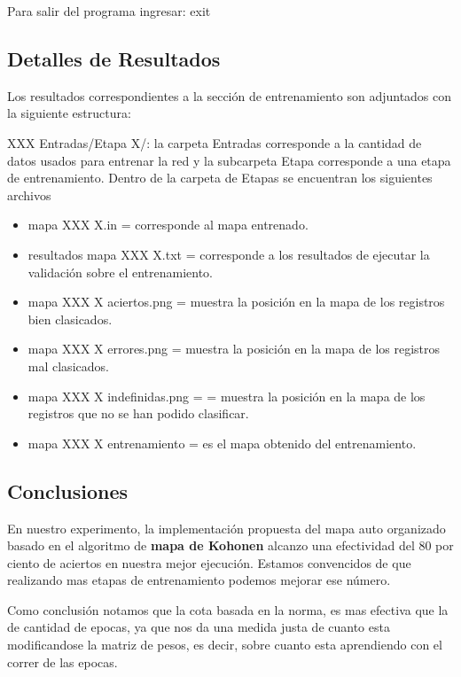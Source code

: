 Para salir del programa ingresar: exit


\subsection{Detalles de Resultados}

Los resultados correspondientes a la sección de entrenamiento son adjuntados con 
la siguiente estructura:

XXX Entradas/Etapa X/: la carpeta Entradas corresponde a la cantidad de datos usados para entrenar la red
y la subcarpeta Etapa corresponde a una etapa de entrenamiento. Dentro de la carpeta de
Etapas se encuentran los siguientes archivos

\begin{itemize}
	\item mapa XXX X.in =  corresponde al mapa entrenado.
	\item resultados mapa XXX X.txt = corresponde a los resultados de ejecutar la
validación sobre el entrenamiento.
	\item mapa XXX X aciertos.png = muestra la posición en la mapa de los registros bien clasicados.
	\item mapa XXX X errores.png = muestra la posición en la mapa de los registros mal clasicados.
	\item mapa XXX X indefinidas.png = = muestra la posición en la mapa de los registros que no
se han podido clasificar.
	\item mapa XXX X entrenamiento = es el mapa obtenido del entrenamiento.
\end{itemize}

\subsection{Conclusiones}

En nuestro experimento, la implementación propuesta del mapa auto organizado basado en el algoritmo
de \textbf{mapa de Kohonen} alcanzo una efectividad del 80 por ciento de aciertos en nuestra mejor
ejecución.
Estamos convencidos de que realizando mas etapas de entrenamiento podemos mejorar ese número.

Como conclusión notamos que la cota basada en la norma, es mas efectiva que la de cantidad de epocas,
ya que nos da una medida justa de cuanto esta modificandose la matriz de pesos, es decir, sobre cuanto
esta aprendiendo con el correr de las epocas.













